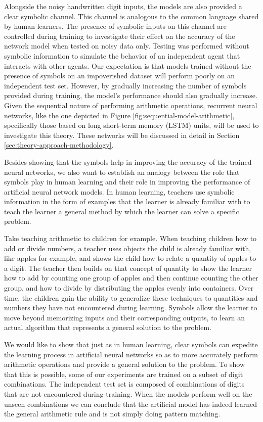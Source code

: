 Alongside the noisy handwritten digit inputs, the models are also provided a clear symbolic channel. This channel is analogous to the common language shared by human learners. The presence of symbolic inputs on this channel are controlled during training to investigate their effect on the accuracy of the network model when tested on noisy data only. Testing was performed without symbolic information to simulate the behavior of an independent agent that interacts with other agents. Our expectation is that models trained without the presence of symbols on an impoverished dataset will perform poorly on an independent test set. However, by gradually increasing the number of symbols provided during training, the model's performance should also gradually increase. Given the sequential nature of performing arithmetic operations, recurrent neural networks, like the one depicted in Figure \ref{fig:sequential-model-arithmetic}, specifically those based on long short-term memory (LSTM) units, will be used to investigate this theory. These networks will be discussed in detail in Section \ref{sec:theory-approach-methodology}.

Besides showing that the symbols help in improving the accuracy of the trained neural networks, we also want to establish an analogy between the role that symbols play in human learning and their role in improving the performance of artificial neural network models. In human learning, teachers use symbolic information in the form of examples that the learner is already familiar with to teach the learner a general method by which the learner can solve a specific problem.

Take teaching arithmetic to children for example. When teaching children how to add or divide numbers, a teacher uses objects the child is already familiar with, like apples for example, and shows the child how to relate a quantity of apples to a digit. The teacher then builds on that concept of quantity to show the learner how to add by counting one group of apples and then continue counting the other group, and how to divide by distributing the apples evenly into containers. Over time, the children gain the ability to generalize these techniques to quantities and numbers they have not encountered during learning. Symbols allow the learner to move beyond memorizing inputs and their corresponding outputs, to learn an actual algorithm that represents a general solution to the problem.

We would like to show that just as in human learning, clear symbols can expedite the learning process in artificial neural networks so as to more accurately perform arithmetic operations and provide a general solution to the problem. To show that this is possible, some of our experiments are trained on a subset of digit combinations. The independent test set is composed of combinations of digits that are not encountered during training. When the models perform well on the unseen combinations we can conclude that the artificial model has indeed learned the general arithmetic rule and is not simply doing pattern matching. 

